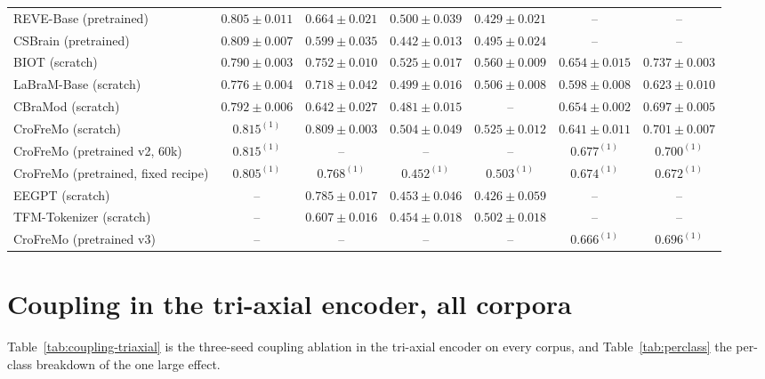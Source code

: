\begin{table}[h]
\begin{tabular}{lcccccc}
REVE-Base (pretrained) & $0.805 \pm 0.011$ & $0.664 \pm 0.021$ & $0.500 \pm 0.039$ & $0.429 \pm 0.021$ & -- & -- \\
CSBrain (pretrained) & $0.809 \pm 0.007$ & $0.599 \pm 0.035$ & $0.442 \pm 0.013$ & $0.495 \pm 0.024$ & -- & -- \\
BIOT (scratch) & $0.790 \pm 0.003$ & $0.752 \pm 0.010$ & $0.525 \pm 0.017$ & $0.560 \pm 0.009$ & $0.654 \pm 0.015$ & $0.737 \pm 0.003$ \\
LaBraM-Base (scratch) & $0.776 \pm 0.004$ & $0.718 \pm 0.042$ & $0.499 \pm 0.016$ & $0.506 \pm 0.008$ & $0.598 \pm 0.008$ & $0.623 \pm 0.010$ \\
CBraMod (scratch) & $0.792 \pm 0.006$ & $0.642 \pm 0.027$ & $0.481 \pm 0.015$ & -- & $0.654 \pm 0.002$ & $0.697 \pm 0.005$ \\
CroFreMo (scratch) & $0.815^{(1)}$ & $0.809 \pm 0.003$ & $0.504 \pm 0.049$ & $0.525 \pm 0.012$ & $0.641 \pm 0.011$ & $0.701 \pm 0.007$ \\
CroFreMo (pretrained v2, 60k) & $0.815^{(1)}$ & -- & -- & -- & $0.677^{(1)}$ & $0.700^{(1)}$ \\
CroFreMo (pretrained, fixed recipe) & $0.805^{(1)}$ & $0.768^{(1)}$ & $0.452^{(1)}$ & $0.503^{(1)}$ & $0.674^{(1)}$ & $0.672^{(1)}$ \\
EEGPT (scratch) & -- & $0.785 \pm 0.017$ & $0.453 \pm 0.046$ & $0.426 \pm 0.059$ & -- & -- \\
TFM-Tokenizer (scratch) & -- & $0.607 \pm 0.016$ & $0.454 \pm 0.018$ & $0.502 \pm 0.018$ & -- & -- \\
CroFreMo (pretrained v3) & -- & -- & -- & -- & $0.666^{(1)}$ & $0.696^{(1)}$ \\
\bottomrule
\end{tabular}
\end{table}

\section{Coupling in the tri-axial encoder, all corpora}
\label{app:triaxial-coupling}

Table~\ref{tab:coupling-triaxial} is the three-seed coupling ablation in
the tri-axial encoder on every corpus, and Table~\ref{tab:perclass} the
per-class breakdown of the one large effect.


